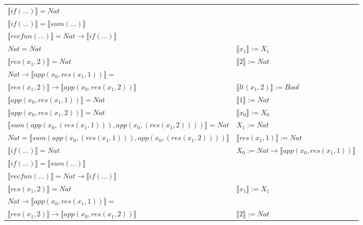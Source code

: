 \begin{exercise}
\begin{description}
\begin{center}
\begin{longtable}[!h]{ | l | l | }
                        $ \llbracket if(...) \rrbracket = Nat$ & \\
                        $ \llbracket if(...) \rrbracket =  \llbracket sum(...) \rrbracket$ & \\
                        $ \llbracket recfun(...) \rrbracket =   Nat  \to  \llbracket if(...) \rrbracket $& \\
                    \hline
                        $Nat = Nat$ &  $ \llbracket x_1 \rrbracket := X_1$ \\
                        $ \llbracket res(x_1,2) \rrbracket = Nat$ & $ \llbracket 2 \rrbracket := Nat$  \\
                        $Nat \to  \llbracket app(x_0, res(x_1,1)) \rrbracket = $ & \\
			     $ \llbracket res(x_1,2) \rrbracket \to  \llbracket app(x_0, res(x_1,2)) \rrbracket$ & $ \llbracket lt(x_1 , 2) \rrbracket := Bool$  \\
                        $ \llbracket app(x_0, res(x_1,1)) \rrbracket = Nat$ &  $ \llbracket 1 \rrbracket := Nat$  \\
                        $ \llbracket app(x_0, res(x_1,2)) \rrbracket = Nat$ & $ \llbracket x_0 \rrbracket := X_0$  \\
                        $ \llbracket sum(app(x_0, (res(x_1,1))), app(x_0, (res(x_1,2))))  \rrbracket = Nat$ &  $X_1 := Nat$ \\
                        $Nat =  \llbracket sum(app(x_0, (res(x_1,1))), app(x_0, (res(x_1,2)))) \rrbracket$ & $ \llbracket res(x_1,1) \rrbracket := Nat$\\
                        $ \llbracket if(...) \rrbracket = Nat$ &     $X_0 := Nat \to  \llbracket app(x_0, res(x_1,1)) \rrbracket$ \\
                        $ \llbracket if(...) \rrbracket =  \llbracket sum(...) \rrbracket$ & \\
                        $ \llbracket recfun(...) \rrbracket =   Nat  \to  \llbracket if(...) \rrbracket $ & \\
                    \hline
                        $ \llbracket res(x_1,2) \rrbracket = Nat$ & $ \llbracket x_1 \rrbracket := X_1$  \\
                        $Nat \to  \llbracket app(x_0, res(x_1,1)) \rrbracket =$ & \\ 
	             $ \llbracket res(x_1,2) \rrbracket \to  \llbracket app(x_0, res(x_1,2)) \rrbracket$ & $ \llbracket 2 \rrbracket := Nat$ \\

\end{longtable}
\end{center}
\end{description}
\end{exercise}
